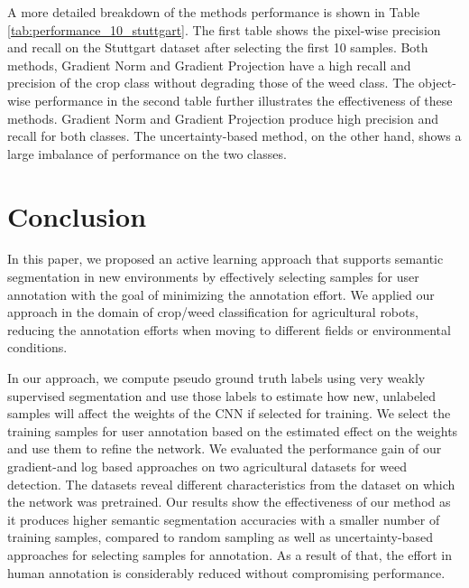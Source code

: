 \documentclass[letterpaper, 10 pt, conference]{ieeeconf}  %
\begin{document}
A more detailed breakdown of the methods performance is shown in Table \ref{tab:performance_10_stuttgart}. The first table shows the pixel-wise precision and recall on the Stuttgart dataset after selecting the first 10 samples. Both methods, Gradient Norm and Gradient Projection have a high recall and precision of the crop class without degrading those of the weed class. The object-wise performance in the second table further illustrates the effectiveness of these methods. Gradient Norm and Gradient Projection produce high precision and recall for both classes. The uncertainty-based method, on the other hand, shows a large imbalance of performance on the two classes.
   






\section{Conclusion}
\label{sec:conclusion}

In this paper, we proposed an active learning approach that supports semantic
segmentation in new environments by effectively selecting samples for user
annotation with the goal of minimizing the annotation effort. We applied our
approach in the domain of crop/weed classification for agricultural robots,
reducing the annotation efforts when moving to different fields or environmental
conditions.

In our approach, we compute pseudo ground truth labels using very weakly supervised 
segmentation and use those labels to estimate how new, unlabeled samples will 
affect the weights of the CNN if selected for training. We select the training
samples for user annotation based on the estimated effect on the weights and use them to refine the 
network. We evaluated  the performance gain of our gradient-and log based 
approaches on two agricultural  datasets for weed detection. The datasets 
reveal different characteristics from the dataset on which the network was pretrained.
Our results show the effectiveness of our method as it produces higher semantic segmentation
accuracies with a smaller number of training samples, compared to random sampling as
well as uncertainty-based approaches for selecting samples for annotation. As a result
of that, the effort in human annotation is considerably reduced without compromising
performance.
 



\end{document}
